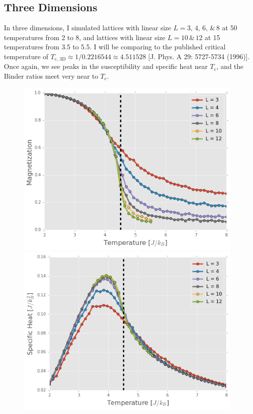 \documentclass[11pt, oneside]{article}
\begin{document}
\subsection{Three Dimensions}
In three dimensions, I simulated lattices with linear size $L=3,\,4,\,6,\,\&\,8$ at 50 temperatures from 2 to 8, and lattices with linear size $L=10\,\&\,12$ at 15 temperatures from 3.5 to 5.5. I will be comparing to the published critical temperature of $T_{\text{c, 3D}}\approx1/0.2216544\approx4.511528$ [J. Phys. A 29: 5727-5734 (1996)]. Once again, we see peaks in the susceptibility and specific heat near $T_\text{c}$, and the Binder ratios meet very near to $T_\text{c}$.
\begin{figure}[H]
\begin{minipage}{0.47\textwidth}
    \includegraphics[width=\linewidth]{img/3D/mag}
    \end{minipage}
    \hspace{\fill} %
    \begin{minipage}{0.47\textwidth}
    \includegraphics[width=\linewidth]{img/3D/C}
    \end{minipage}
    

\end{figure}
\end{document}
